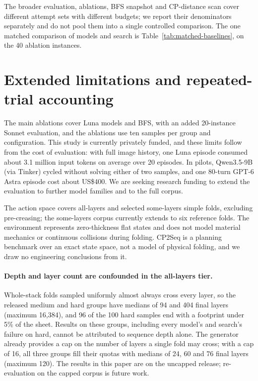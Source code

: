 The broader evaluation, ablations, BFS snapshot and CP-distance scan cover different attempt
sets with different budgets; we report their denominators separately and do not pool them into
a single controlled comparison. The one matched comparison of models and search is
Table~\ref{tab:matched-baselines}, on the 40 ablation instances.

\section{Extended limitations and repeated-trial accounting}
\label{app:extended-limitations}

The main ablations cover Luna models and BFS, with an added 20-instance Sonnet evaluation, and the ablations use ten samples per group and
configuration. This study is currently privately funded, and these limits follow from the cost of
evaluation: with full image history, one Luna episode consumed about 3.1 million input tokens on
average over 20 episodes. In pilots, Qwen3.5-9B (via Tinker) cycled without solving either of two samples, and one
80-turn GPT-6 Astra episode cost about US\$400. We are seeking research funding to extend the evaluation to further
model families and to the full corpus.

The action space covers all-layers and selected some-layers simple folds, excluding
pre-creasing; the some-layers corpus currently extends to six reference folds. The environment
represents zero-thickness flat states and does not model material mechanics or continuous
collisions during folding. CP2Seq is a planning benchmark over an exact state space, not a model
of physical folding, and we draw no engineering conclusions from it.

\paragraph{Depth and layer count are confounded in the all-layers tier.} Whole-stack folds sampled
uniformly almost always cross every layer, so the released medium and hard groups have medians of
94 and 404 final layers (maximum 16,384), and 96 of the 100 hard samples end with a footprint under
5\% of the sheet. Results on these groups, including every model's and search's failure on hard,
cannot be attributed to sequence depth alone. The generator already provides a cap on the number
of layers a single fold may cross; with a cap of 16, all three groups fill their quotas with medians
of 24, 60 and 76 final layers (maximum 120). The results in this paper are on the uncapped release;
re-evaluation on the capped corpus is future work.

